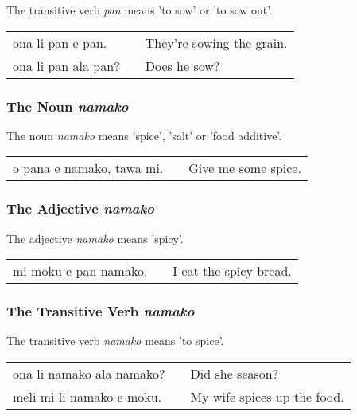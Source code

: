The transitive verb \textit{pan} means 'to sow' or 'to sow out'.

\begin{supertabular}{p{5,5cm}|ll}
ona li pan e pan. && They're sowing the grain. \\
ona li pan ala pan? && Does he sow? \\
\end{supertabular} 

%
%
\subsubsection*{The Noun \textit{namako}}
%

The noun \textit{namako} means 'spice', 'salt' or 'food additive'.

\begin{supertabular}{p{5,5cm}|ll}
o pana e namako, tawa mi. &&  Give me some spice. \\
\end{supertabular} 

%
%
\subsubsection*{The Adjective \textit{namako}}
%

The adjective \textit{namako} means 'spicy'. 

\begin{supertabular}{p{5,5cm}|ll}
mi moku e pan namako. && I eat the spicy bread. \\
\end{supertabular}

%
%
\subsubsection*{The Transitive Verb \textit{namako}}
%

The transitive verb \textit{namako} means 'to spice'. 

\begin{supertabular}{p{5,5cm}|ll}
ona li namako ala namako? && Did she season? \\
meli mi li namako e moku. &&  My wife spices up the food. \\
\end{supertabular}


